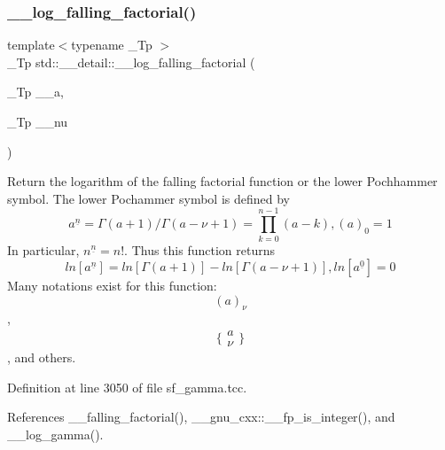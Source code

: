 \mbox{\label{namespacestd_1_1____detail_abc3aa91fde134d9f01be8fc8e7c7cc79}} 
\subsubsection{\texorpdfstring{\+\_\+\+\_\+log\+\_\+falling\+\_\+factorial()}{\_\_log\_falling\_factorial()}}
{\footnotesize\ttfamily template$<$typename \+\_\+\+Tp $>$ \\
\+\_\+\+Tp std\+::\+\_\+\+\_\+detail\+::\+\_\+\+\_\+log\+\_\+falling\+\_\+factorial (\begin{DoxyParamCaption}\item[{\+\_\+\+Tp}]{\+\_\+\+\_\+a,  }\item[{\+\_\+\+Tp}]{\+\_\+\+\_\+nu }\end{DoxyParamCaption})}



Return the logarithm of the falling factorial function or the lower Pochhammer symbol. The lower Pochammer symbol is defined by \[ a^{\underline{n}} = \Gamma(a + 1) / \Gamma(a - \nu + 1) = \prod_{k=0}^{n-1} (a - k), (a)_0 = 1 \] In particular, $ n^{\underline{n}} = n! $. Thus this function returns \[ ln[a^{\underline{n}}] = ln[\Gamma(a + 1)] - ln[\Gamma(a - \nu + 1)], ln[a^{\underline{0}}] = 0 \] Many notations exist for this function\+: \[ (a)_\nu \], \[ \{ \begin{array}{c} a \\ \nu \end{array} \} \], and others. 



Definition at line 3050 of file sf\+\_\+gamma.\+tcc.



References \+\_\+\+\_\+falling\+\_\+factorial(), \+\_\+\+\_\+gnu\+\_\+cxx\+::\+\_\+\+\_\+fp\+\_\+is\+\_\+integer(), and \+\_\+\+\_\+log\+\_\+gamma().

\mbox{\label{namespacestd_1_1____detail_af6c4c0192a07f467fd9ddeebb28a34d4}} 
